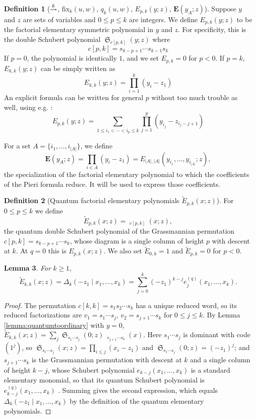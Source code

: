 \documentclass{amsart}
\newtheorem{lemma}{Lemma}[section]
\theoremstyle{definition}
\newtheorem{definition}[lemma]{Definition}
\theoremstyle{remark}
\numberwithin{equation}{section}
\DeclareMathOperator{\sch}{\mathfrak{S}}
\DeclareMathOperator{\qsch}{\widetilde{\mathfrak{S}}}
\newcommand{\xrightsquigarrow}[2][]{%
	\mathrel{\mathop{\rightsquigarrow}\limits^{\scriptstyle #2}%
	\ifx\hfuzz#1\hfuzz\else_{\scriptstyle #1}\fi}%
}
\newcommand{\tom}[1]{\ensuremath{\xrightsquigarrow{#1}}}
\newcommand{\fx}{\mathrm{fix}}
\newcommand{\wte}{\mathbf{E}}
\newcommand{\qelem}{\widetilde{E}}
\begin{document}
\begin{definition}[$\tom{k}$, $\fx_{k}(u,w)$, $q_k(u,w)$, $E_{p,k}(y;z)$, $\wte(y_A;z)$]
Suppose $y$ and $z$ are sets of variables and $0\leq p\leq k$ are integers. We define $E_{p,k}(y;z)$ to be the factorial elementary symmetric polynomial in $y$ and $z$. For specificity, this is the double Schubert polynomial $\sch_{c[p,k]}(y;z)$ where
$$c[p,k] = s_{k-p+1}\cdots s_{k-1}s_k$$
If $p=0$, the polynomial is identically $1$, and we set $E_{p,k}=0$ for $p<0$. If $p=k$, $E_{k,k}(y;z)$ can be simply written as
$$E_{k,k}(y;z)=\prod_{i=1}^k(y_i-z_1)$$
An explicit formula can be written for general $p$ without too much trouble as well, using e.g. \cite{molev1999littlewood}:
$$E_{p,k}(y;z)=\sum_{1\leq i_1<\cdots<i_p\leq k}\prod_{j=1}^p(y_{i_j}-z_{i_j-j+1})$$

For a set $A=\{i_1,\ldots,i_{|A|}\}$, we define
$$\wte(y_A;z)=\prod_{i\in A}(y_i-z_1)=E_{|A|,|A|}(y_{i_1},\ldots,y_{i_{|A|}};z),$$
the specialization of the factorial elementary polynomial to which the coefficients of the Pieri formula reduce. It will be used to express those coefficients.
\end{definition}


\begin{definition}[Quantum factorial elementary polynomials $\qelem_{p,k}(x;z)$] \label{def:qelem}
For $0\leq p\leq k$ we define
$$\qelem_{p,k}(x;z)=\qsch_{c[p,k]}(x;z),$$
the quantum double Schubert polynomial of the Grassmannian permutation $c[p,k]=s_{k-p+1}\cdots s_k$, whose diagram is a single column of height $p$ with descent at $k$. At $q=0$ this is $E_{p,k}(x;z)$. We also set $\qelem_{0,k}=1$ and $\qelem_{p,k}=0$ for $p<0$.
\end{definition}

\begin{lemma} \label{lemma:qelemkk}
For $k\geq1$,
$$\qelem_{k,k}(x;z)=\Delta_k(-z_1\mid x_1,\ldots,x_k)=\sum_{j=0}^{k}(-z_1)^{k-j}e_j^{(q)}(x_1,\ldots,x_k).$$
\end{lemma}
\begin{proof}
The permutation $c[k,k]=s_1s_2\cdots s_k$ has a unique reduced word, so its reduced factorizations are $v_1=s_1\cdots s_j$, $v_2=s_{j+1}\cdots s_k$ for $0\leq j\leq k$. By Lemma \ref{lemma:quantumtoordinary} with $y=0$, $\qelem_{k,k}(x;z)=\sum_{j}\sch_{s_1\cdots s_j}(0;z)\,\qsch_{s_{j+1}\cdots s_k}(x)$. Here $s_1\cdots s_j$ is dominant with code $(1^j)$, so $\sch_{s_1\cdots s_j}(x;z)=\prod_{i\leq j}(x_i-z_1)$ and $\sch_{s_1\cdots s_j}(0;z)=(-z_1)^j$; and $s_{j+1}\cdots s_k$ is the Grassmannian permutation with descent at $k$ and a single column of height $k-j$, whose Schubert polynomial $e_{k-j}(x_1,\ldots,x_k)$ is a standard elementary monomial, so that its quantum Schubert polynomial is $e^{(q)}_{k-j}(x_1,\ldots,x_k)$ \cite{fomin1997quantum}. Summing gives the second expression, which equals $\Delta_k(-z_1\mid x_1,\ldots,x_k)$ by the definition of the quantum elementary polynomials.
\end{proof}
\end{document}
